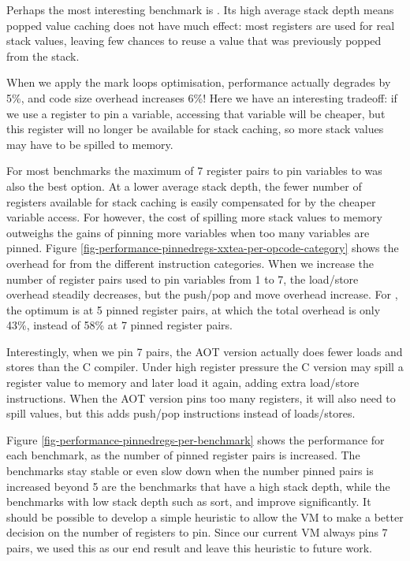 Perhaps the most interesting benchmark is . Its high average stack depth means popped value caching does not have much effect: most registers are used for real stack values, leaving few chances to reuse a value that was previously popped from the stack. 

When we apply the mark loops optimisation, performance actually degrades by 5\%, and code size overhead increases 6\%! Here we have an interesting tradeoff: if we use a register to pin a variable, accessing that variable will be cheaper, but this register will no longer be available for stack caching, so more stack values may have to be spilled to memory.

For most benchmarks the maximum of 7 register pairs to pin variables to was also the best option. At a lower average stack depth, the fewer number of registers available for stack caching is easily compensated for by the cheaper variable access. For  however, the cost of spilling more stack values to memory outweighs the gains of pinning more variables when too many variables are pinned. Figure \ref{fig-performance-pinnedregs-xxtea-per-opcode-category} shows the overhead for  from the different instruction categories. When we increase the number of register pairs used to pin variables from 1 to 7, the load/store overhead steadily decreases, but the push/pop and move overhead increase. For , the optimum is at 5 pinned register pairs, at which the total overhead is only 43\%, instead of 58\% at 7 pinned register pairs.

Interestingly, when we pin 7 pairs, the AOT version actually does fewer loads and stores than the C compiler. Under high register pressure the C version may spill a register value to memory and later load it again, adding extra load/store instructions. When the AOT version pins too many registers, it will also need to spill values, but this adds push/pop instructions instead of loads/stores.

Figure \ref{fig-performance-pinnedregs-per-benchmark} shows the performance for each benchmark, as the number of pinned register pairs is increased. The benchmarks stay stable or even slow down when the number pinned pairs is increased beyond 5 are the benchmarks that have a high stack depth, while the benchmarks with low stack depth such as sort,  and  improve significantly. It should be possible to develop a simple heuristic to allow the VM to make a better decision on the number of registers to pin. Since our current VM always pins 7 pairs, we used this as our end result and leave this heuristic to future work.

